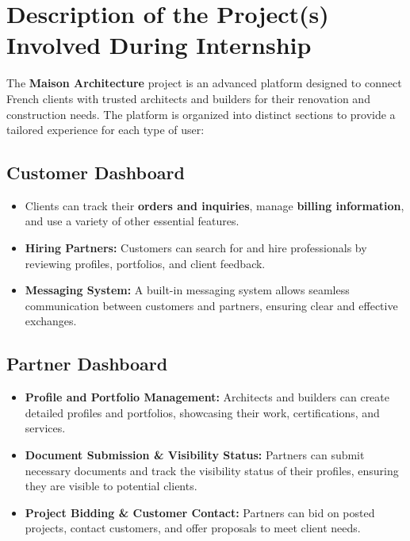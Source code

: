 \section{Description of the Project(s) Involved During Internship}

The \textbf{Maison Architecture} project is an advanced platform designed to connect French clients with trusted architects and builders for their renovation and construction needs. The platform is organized into distinct sections to provide a tailored experience for each type of user:

\subsection{Customer Dashboard}
\begin{itemize}
    \item Clients can track their \textbf{orders and inquiries}, manage \textbf{billing information}, and use a variety of other essential features.
    \item \textbf{Hiring Partners:} Customers can search for and hire professionals by reviewing profiles, portfolios, and client feedback.
    \item \textbf{Messaging System:} A built-in messaging system allows seamless communication between customers and partners, ensuring clear and effective exchanges.
\end{itemize}

\subsection{Partner Dashboard}
\begin{itemize}
    \item \textbf{Profile and Portfolio Management:} Architects and builders can create detailed profiles and portfolios, showcasing their work, certifications, and services.
    \item \textbf{Document Submission \& Visibility Status:} Partners can submit necessary documents and track the visibility status of their profiles, ensuring they are visible to potential clients.
    \item \textbf{Project Bidding \& Customer Contact:} Partners can bid on posted projects, contact customers, and offer proposals to meet client needs.
\end{itemize}

